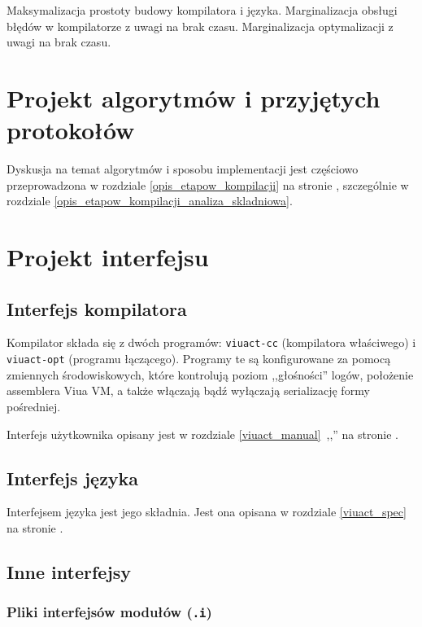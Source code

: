 Maksymalizacja prostoty budowy kompilatora i języka.
Marginalizacja obsługi błędów w kompilatorze z uwagi na brak czasu.
Marginalizacja optymalizacji z uwagi na brak czasu.

\section{Projekt algorytmów i przyjętych protokołów}

Dyskusja na temat algorytmów i sposobu implementacji jest częściowo przeprowadzona w rozdziale
\ref{opis_etapow_kompilacji} na stronie \pageref{opis_etapow_kompilacji}, szczególnie w rozdziale
\ref{opis_etapow_kompilacji_analiza_skladniowa}.

\section{Projekt interfejsu}

\subsection{Interfejs kompilatora}

Kompilator składa się z dwóch programów: \texttt{viuact-cc} (kompilatora właściwego) i \texttt{viuact-opt}
(programu łączącego). Programy te są konfigurowane za pomocą zmiennych środowiskowych, które kontrolują poziom
,,głośności'' logów, położenie assemblera Viua VM, a także włączają bądź wyłączają serializację formy
pośredniej.

Interfejs użytkownika opisany jest w rozdziale \ref{viuact_manual}~,,''
na stronie \pageref{viuact_manual}.

\subsection{Interfejs języka}

Interfejsem języka jest jego składnia.
Jest ona opisana w rozdziale \ref{viuact_spec} na stronie \pageref{viuact_spec}.

\subsection{Inne interfejsy}

\subsubsection{Pliki interfejsów modułów (\texttt{.i})}
\label{pliki_interfejsow_modulow}

